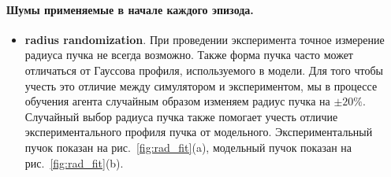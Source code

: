 \paragraph{Шумы применяемые в начале каждого эпизода.} 
\begin{itemize}
    \item \textbf{radius randomization}. При проведении эксперимента точное измерение радиуса пучка не всегда возможно. Также форма пучка часто может отличаться от Гауссова профиля, используемого в модели. Для того чтобы учесть это отличие между симулятором и экспериментом, мы в процессе обучения агента случайным образом изменяем радиус пучка на $\pm 20\%$. Случайный выбор радиуса пучка также помогает учесть отличие экспериментального профиля пучка от модельного. Экспериментальный пучок показан на рис.~\ref{fig:rad_fit}(a), модельный пучок показан на рис.~\ref{fig:rad_fit}(b).
\end{itemize}

